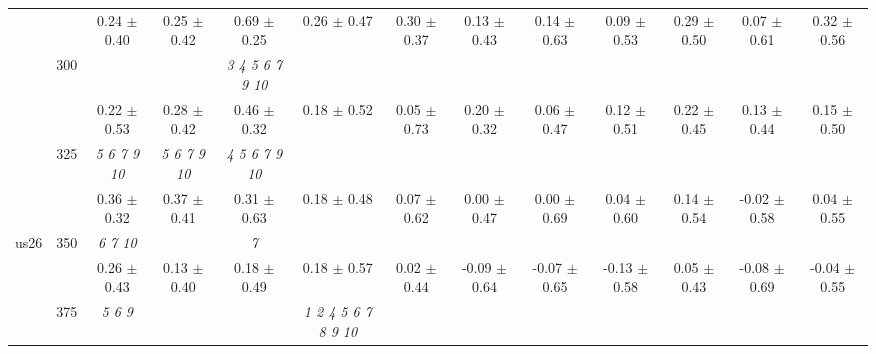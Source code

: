 \begin{table}[h]
{\begin{tabular}{
        ccccccccccccc}
 & & \cellcolor[HTML]{EFEFEF} 0.24 $\pm$ 0.40& \cellcolor[HTML]{EFEFEF} 0.25 $\pm$ 0.42& \cellcolor[HTML]{EFEFEF} 0.69 $\pm$ 0.25& \cellcolor[HTML]{EFEFEF} 0.26 $\pm$ 0.47& \cellcolor[HTML]{EFEFEF} 0.30 $\pm$ 0.37& \cellcolor[HTML]{EFEFEF} 0.13 $\pm$ 0.43& \cellcolor[HTML]{EFEFEF} 0.14 $\pm$ 0.63& \cellcolor[HTML]{EFEFEF} 0.09 $\pm$ 0.53& \cellcolor[HTML]{EFEFEF} 0.29 $\pm$ 0.50& \cellcolor[HTML]{EFEFEF} 0.07 $\pm$ 0.61& \cellcolor[HTML]{EFEFEF} 0.32 $\pm$ 0.56 \\ 
 & \multirow{2}{*}{300}& & & \textit{  3  4  5  6  7  9 10 }& & & & & & & &  \\ 
 & & 0.22 $\pm$ 0.53& 0.28 $\pm$ 0.42& 0.46 $\pm$ 0.32& 0.18 $\pm$ 0.52& 0.05 $\pm$ 0.73& 0.20 $\pm$ 0.32& 0.06 $\pm$ 0.47& 0.12 $\pm$ 0.51& 0.22 $\pm$ 0.45& 0.13 $\pm$ 0.44& 0.15 $\pm$ 0.50 \\ 
 & \multirow{2}{*}{325}& \cellcolor[HTML]{EFEFEF} \textit{  5  6  7  9 10 }& \cellcolor[HTML]{EFEFEF} \textit{  5  6  7  9 10 }& \cellcolor[HTML]{EFEFEF} \textit{  4  5  6  7  9 10 }& \cellcolor[HTML]{EFEFEF} & \cellcolor[HTML]{EFEFEF} & \cellcolor[HTML]{EFEFEF} & \cellcolor[HTML]{EFEFEF} & \cellcolor[HTML]{EFEFEF} & \cellcolor[HTML]{EFEFEF} & \cellcolor[HTML]{EFEFEF} & \cellcolor[HTML]{EFEFEF}  \\ 
 & & \cellcolor[HTML]{EFEFEF} 0.36 $\pm$ 0.32& \cellcolor[HTML]{EFEFEF} 0.37 $\pm$ 0.41& \cellcolor[HTML]{EFEFEF} 0.31 $\pm$ 0.63& \cellcolor[HTML]{EFEFEF} 0.18 $\pm$ 0.48& \cellcolor[HTML]{EFEFEF} 0.07 $\pm$ 0.62& \cellcolor[HTML]{EFEFEF} 0.00 $\pm$ 0.47& \cellcolor[HTML]{EFEFEF} 0.00 $\pm$ 0.69& \cellcolor[HTML]{EFEFEF} 0.04 $\pm$ 0.60& \cellcolor[HTML]{EFEFEF} 0.14 $\pm$ 0.54& \cellcolor[HTML]{EFEFEF} -0.02 $\pm$ 0.58& \cellcolor[HTML]{EFEFEF} 0.04 $\pm$ 0.55 \\ 
 \multirow{4}{*}{us26} & \multirow{2}{*}{350}& \textit{  6  7 10 }& & \textit{ 7 }& & & & & & & &  \\ 
 & & 0.26 $\pm$ 0.43& 0.13 $\pm$ 0.40& 0.18 $\pm$ 0.49& 0.18 $\pm$ 0.57& 0.02 $\pm$ 0.44& -0.09 $\pm$ 0.64& -0.07 $\pm$ 0.65& -0.13 $\pm$ 0.58& 0.05 $\pm$ 0.43& -0.08 $\pm$ 0.69& -0.04 $\pm$ 0.55 \\ 
 & \multirow{2}{*}{375}& \cellcolor[HTML]{EFEFEF} \textit{ 5 6 9 }& \cellcolor[HTML]{EFEFEF} & \cellcolor[HTML]{EFEFEF} & \cellcolor[HTML]{EFEFEF} \textit{  1  2  4  5  6  7  8  9 10 }& \cellcolor[HTML]{EFEFEF} & \cellcolor[HTML]{EFEFEF} & \cellcolor[HTML]{EFEFEF} & \cellcolor[HTML]{EFEFEF} & \cellcolor[HTML]{EFEFEF} & \cellcolor[HTML]{EFEFEF} & \cellcolor[HTML]{EFEFEF}  \\ 

\end{tabular}}
\end{table}
